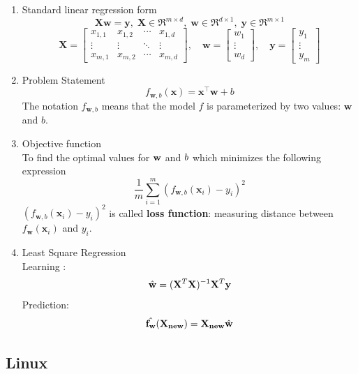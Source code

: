 \documentclass{article}
\begin{document}
\begin{enumerate}
    \item Standard linear regression form
    \[\mathbf{Xw=y},\; \mathbf{X}\in\Re^{ m\times d},\;\mathbf{w}\in\Re^{d\times 1},\; \mathbf{y}\in\Re^{m\times 1}\]
    \[\mathbf{X} = \begin{bmatrix}x_{1,1} & x_{1,2} & \cdots & x_{1,d} \\\vdots & \vdots & \ddots & \vdots \\x_{m,1} & x_{m,2} &\cdots & x_{m,d}\end{bmatrix}, \quad\mathbf{w} = \begin{bmatrix}w_{1} \\\vdots \\w_{d}\end{bmatrix}, \quad\mathbf{y} = \begin{bmatrix}y_{1} \\\vdots \\y_{m}\end{bmatrix}\]
    \item Problem Statement
    \[f_{\mathbf{w},b}(\mathbf{x}) = \mathbf{x}^\top \mathbf{w} + b\]
    The notation $f_{\mathbf{w},b}$ means that the model $f$ is parameterized by two values: $\mathbf{w}$ and $b$.
    \item Objective function\\
    To find the optimal values for $\mathbf{w\*}$ and $b\*$ which minimizes the following expression
    \[\frac{1}{m} \sum_{i=1}^{m} \left( f_{\mathbf{w},b}(\mathbf{x}_i) - y_i \right)^2\]
    $\left( f_{\mathbf{w},b}(\mathbf{x}_i) - y_i \right)^2$ is called \textbf{loss function}: measuring distance between $f_\mathbf{w}(\mathbf{x}_i)$ and $y_i$.
    \item Least Square Regression \\
    Learning : \[\Hat{\mathbf{w}} = (\mathbf{X}^T\mathbf{X})^{-1}\mathbf{X}^T\mathbf{y}\]
    Prediction: \[\Hat{\mathbf{f_w}}(\mathbf{X_{new}}) = \mathbf{X_{new}}\Hat{\mathbf{w}}\]


\end{enumerate}

\newpage
\subsection{Linux}
\end{document}
